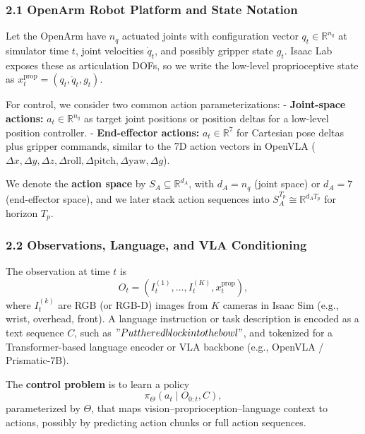\documentclass[
]{article}
\theoremstyle{remark}
\begin{document}
\subsubsection{2.1 OpenArm Robot Platform and State
Notation}\label{openarm-robot-platform-and-state-notation}

Let the OpenArm have \(n_q\) actuated joints with configuration vector
\(q_t \in \mathbb{R}^{n_q}\) at simulator time \(t\), joint velocities
\(\dot q_t\), and possibly gripper state \(g_t\). Isaac Lab exposes
these as articulation DOFs, so we write the low-level proprioceptive
state as
\(x^{\text{prop}}_t = (q_t, \dot q_t, g_t)\). \cite{isaaclab-github,act-openarm-notes}

For control, we consider two common action parameterizations: -
\textbf{Joint-space actions:} \(a_t \in \mathbb{R}^{n_q}\) as target
joint positions or position deltas for a low-level position controller.
- \textbf{End-effector actions:} \(a_t \in \mathbb{R}^7\) for Cartesian
pose deltas plus gripper commands, similar to the 7D action vectors in
OpenVLA
(\(\Delta x,\Delta y,\Delta z,\Delta \text{roll},\Delta \text{pitch},\Delta \text{yaw},\Delta g\)). \cite{openvla-notes}

We denote the \textbf{action space} by
\(S_A \subseteq \mathbb{R}^{d_A}\), with \(d_A = n_q\) (joint space) or
\(d_A = 7\) (end-effector space), and we later stack action sequences
into \(S_A^{T_p} \cong \mathbb{R}^{d_A T_p}\) for horizon
\(T_p\). \cite{diffusion-policy2023,diffpolicy-theory-notes}

\subsubsection{2.2 Observations, Language, and VLA
Conditioning}\label{observations-language-and-vla-conditioning}

The observation at time \(t\) is \[
O_t = (I_t^{(1)}, \dots, I_t^{(K)}, x^{\text{prop}}_t),
\] where \(I_t^{(k)}\) are RGB (or RGB-D) images from \(K\) cameras in
Isaac Sim (e.g., wrist, overhead, front). A language instruction or task
description is encoded as a text sequence \(C\), such as
\("Put the red block into the bowl"\), and tokenized for a
Transformer-based language encoder or VLA backbone (e.g., OpenVLA /
Prismatic-7B). \cite{openvla-notes,act-openarm-notes,isaaclab-github}

The \textbf{control problem} is to learn a policy \[
\pi_\Theta(a_t \mid O_{0:t}, C),
\] parameterized by \(\Theta\), that maps
vision--proprioception--language context to actions, possibly by
predicting action chunks or full action
sequences. \cite{act-project-page,diffpolicy-theory-notes,diffusion-policy2023}
\end{document}

